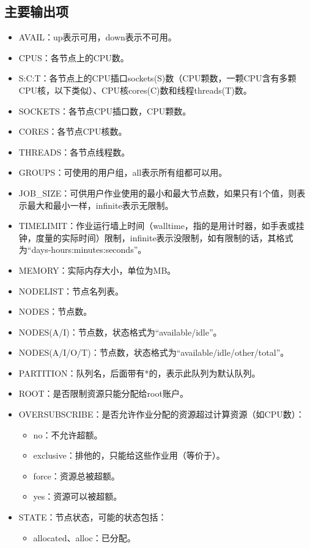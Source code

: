 \subsection{主要输出项}
\begin{itemize}
	\item AVAIL：up表示可用，down表示不可用。
    \item CPUS：各节点上的CPU数。
    \item S:C:T：各节点上的CPU插口sockets(S)数（CPU颗数，一颗CPU含有多颗CPU核，以下类似）、CPU核cores(C)数和线程threads(T)数。
    \item SOCKETS：各节点CPU插口数，CPU颗数。
    \item CORES：各节点CPU核数。
    \item THREADS：各节点线程数。
    \item GROUPS：可使用的用户组，all表示所有组都可以用。
	\item JOB\_SIZE：可供用户作业使用的最小和最大节点数，如果只有1个值，则表示最大和最小一样，infinite表示无限制。
	\item TIMELIMIT：作业运行墙上时间（walltime，指的是用计时器，如手表或挂钟，度量的实际时间）限制，infinite表示没限制，如有限制的话，其格式为``days-hours:minutes:seconds''。
    \item MEMORY：实际内存大小，单位为MB。
    \item NODELIST：节点名列表。
    \item NODES：节点数。
    \item NODES(A/I)：节点数，状态格式为``available/idle''。
    \item NODES(A/I/O/T)：节点数，状态格式为``available/idle/other/total''。
	\item PARTITION：队列名，后面带有*的，表示此队列为默认队列。
    \item ROOT：是否限制资源只能分配给root账户。
    \item OVERSUBSCRIBE：是否允许作业分配的资源超过计算资源（如CPU数）：
	\begin{itemize}
		\item no：不允许超额。
		\item exclusive：排他的，只能给这些作业用（等价于）。
		\item force：资源总被超额。
		\item yes：资源可以被超额。
	\end{itemize}
\newpage
     \item STATE：节点状态，可能的状态包括：
\begin{itemize}
	\item	allocated、alloc：已分配。

\end{itemize}
\end{itemize}
